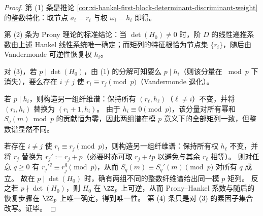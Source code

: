 \begin{proof}
第 (1) 条是推论 \ref{cor:xi-hankel-first-block-determinant-discriminant-weight} 的整数特化：取节点 \(a_i=r_i\) 与权 \(\omega_i=h_i\) 即得。
\par
第 (2) 条为 Prony 理论的标准结论：当 \(\det(H_0)\neq 0\) 时，阶 \(D\) 的线性递推系数由上述 Hankel 线性系统唯一确定；而矩列的特征根恰为节点集 \(\{r_i\}\)，随后由 Vandermonde 可逆性恢复权 \(h_i\)。
\par
对 (3)，若 \(p\mid\det(H_0)\)，由 (1) 的分解可知要么 \(p\mid h_i\)（则该分量在 \(\bmod p\) 下消失），要么存在 \(i\neq j\) 使 \(r_i\equiv r_j\pmod p\)（Vandermonde 退化）。
\par
若 \(p\mid h_i\)，则构造另一组纤维谱：保持所有 \((r_\ell,h_\ell)\)（\(\ell\neq i\)）不变，并将 \((r_i,h_i)\) 替换为 \((r_i+1,h_i)\)。
由于 \(h_i\equiv 0\pmod p\)，该分量对所有幂和 \(S_q(m)\bmod p\) 的贡献恒为零，因此两组谱在模 \(p\) 意义下的全部矩列一致，但整数谱显然不同。
\par
若存在 \(i\neq j\) 使 \(r_i\equiv r_j\pmod p\)，则构造另一组纤维谱：保持所有权 \(h_\ell\) 不变，并将 \(r_j\) 替换为 \(r_j':=r_j+p\)（必要时亦可取 \(r_j+tp\) 以避免与其余 \(r_\ell\) 相等）。
则对任意 \(q\ge 0\) 有 \(r_j'^q\equiv r_j^q\pmod p\)，从而 \(S_q(m)\equiv S_q'(m)\pmod p\) 对所有 \(q\) 成立。
故在 \(p\mid\det(H_0)\) 时，确有两组不同的整数纤维谱给出同一模 \(p\) 矩列。
反之若 \(p\nmid\det(H_0)\)，则 \(H_0\) 在 \(\ZZ_p\) 上可逆，从而 Prony--Hankel 系数与随后的恢复步骤在 \(\ZZ_p\) 上唯一确定，得到唯一性。
第 (4) 条只是对 (3) 的素因子集合改写。证毕。
\end{proof}
